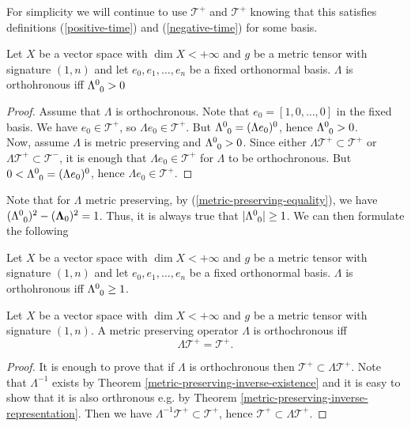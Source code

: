 \documentclass[main.tex]{subfiles}
\begin{document}
For simplicity we will continue to use $\mathcal{T}^{+}$ and $\mathcal{T}^{+}$ knowing that this satisfies definitions (\ref{positive-time}) and (\ref{negative-time}) for some basis.

\begin{lemma}
Let $X$ be a vector space with $\dim X < +\infty$ and $g$ be a metric tensor with signature $(1, n)$ and let $e_0, e_1, \dots, e_n$ be a fixed orthonormal basis. $\Lambda$ is orthohronous iff $\tensor{\Lambda}{^0_0} > 0$
\end{lemma}
\begin{proof}
Assume that $\Lambda$ is orthochronous. Note that $e_0 = [1, 0, \dots, 0]$ in the fixed basis. We have $e_0\in \mathcal{T}^{+}$, so $\Lambda e_0 \in \mathcal{T}^{+}$. But $\tensor{\Lambda}{^0_0} = (\Lambda  e_0)^0$, hence $\tensor{\Lambda}{^0_0} > 0$.\\

Now, assume $\Lambda$ is metric preserving and $\tensor{\Lambda}{^0_0} > 0$. Since either $\Lambda \mathcal{T}^{+}\subset \mathcal{T}^{+}$ or $\Lambda \mathcal{T}^{+}\subset \mathcal{T}^{-}$, it is enough that $\Lambda e_0 \in \mathcal{T}^{+}$ for $\Lambda$ to be orthochronous. But $0 < \tensor{\Lambda}{^0_0} = (\Lambda  e_0)^0$, hence $\Lambda e_0 \in \mathcal{T}^{+}$.
\end{proof}

Note that for $\Lambda$ metric preserving, by (\ref{metric-preserving-equality}), 
we have $(\tensor{\Lambda}{^0_0})^2 - (\bs{\Lambda}_0)^2 = 1$. 
Thus, it is always true that $|\tensor{\Lambda}{^0_0}| \geq 1$. We can then formulate the following
\begin{corollary}
Let $X$ be a vector space with $\dim X < +\infty$ and $g$ be a metric tensor with signature $(1, n)$ and let $e_0, e_1, \dots, e_n$ be a fixed orthonormal basis. $\Lambda$ is orthohronous iff $\tensor{\Lambda}{^0_0} \geq 1$.
\end{corollary}


\begin{theorem}
Let $X$ be a vector space with $\dim X < +\infty$ and $g$ be a metric tensor with signature $(1, n)$. A metric preserving operator $\Lambda$ is orthochronous iff
\begin{equation}
\Lambda \mathcal{T}^{+} = \mathcal{T}^{+}. 
\end{equation}
\end{theorem}
\begin{proof}
It is enough to prove that if $\Lambda$ is orthochronous then $\mathcal{T}^{+}\subset \Lambda \mathcal{T}^{+}$.
Note that $\Lambda^{-1}$ exists by Theorem \ref{metric-preserving-inverse-existence} and it is easy to show that it is also orthronous e.g. by Theorem \ref{metric-preserving-inverse-representation}. Then we have $\Lambda^{-1} \mathcal{T}^{+} \subset \mathcal{T}^{+}$, hence
$\mathcal{T}^{+}\subset \Lambda \mathcal{T}^{+}$. 
\end{proof}
\end{document}
